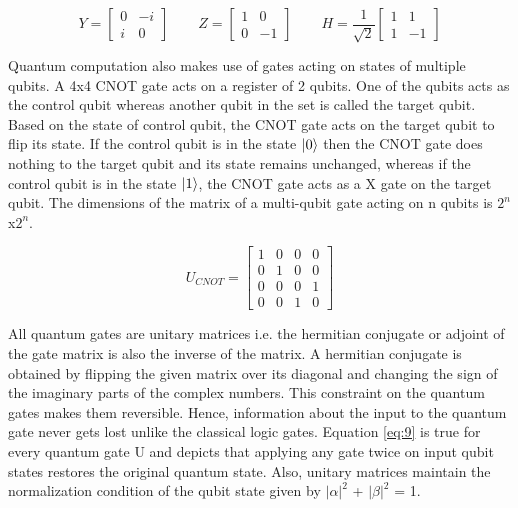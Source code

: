 \documentclass[english,a4paper,11pt,oneside,onecolumn]{book}
\begin{document}
\begin{equation}\label{eq:7}
Y = 
\begin{bmatrix}
0 & -i\\
i & 0
\end{bmatrix}
\hspace{25pt}
Z = 
\begin{bmatrix}
1 & 0\\
0 & -1
\end{bmatrix}
\hspace{25pt}
H = \dfrac{1}{\sqrt{2}}
\begin{bmatrix}
1 & 1\\
1 & -1
\end{bmatrix}
\end{equation}

Quantum computation also makes use of gates acting on states of multiple qubits. A 4x4 CNOT gate acts on a register of 2 qubits. One of the qubits acts as the control qubit whereas another qubit in the set is called the target qubit. Based on the state of control qubit, the CNOT gate acts on the target qubit to flip its state. If the control qubit is in the state \(\ket{0}\) then the CNOT gate does nothing to the target qubit and its state remains unchanged, whereas if the control qubit is in the state \(\ket{1}\), the CNOT gate acts as a X gate on the target qubit. The dimensions of the matrix of a multi-qubit gate acting on n qubits is \(2^n\)x\(2^n\).

\begin{equation}\label{eq:8}
U_{CNOT} = 
\begin{bmatrix}
1 & 0 & 0 & 0\\
0 & 1 & 0 & 0\\
0 & 0 & 0 & 1\\
0 & 0 & 1 & 0
\end{bmatrix}
\end{equation}

All quantum gates are unitary matrices i.e. the hermitian conjugate or adjoint of the gate matrix is also the inverse of the matrix. A hermitian conjugate is obtained by flipping the given matrix over its diagonal and changing the sign of the imaginary parts of the complex numbers. This constraint on the quantum gates makes them reversible. Hence, information about the input to the quantum gate never gets lost unlike the classical logic gates. Equation \ref{eq:9} is true for every quantum gate U and depicts that applying any gate twice on input qubit states restores the original quantum state. Also, unitary matrices maintain the normalization condition of the qubit state given by \(|\alpha|^2\) + \(|\beta|^2\) = 1.
\end{document}
